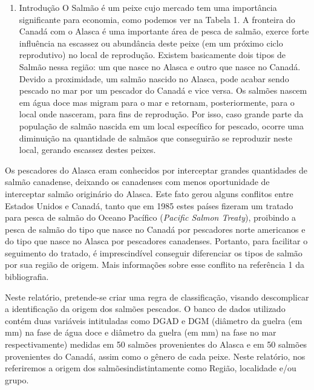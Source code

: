\documentclass[10pt,portuguese,]{article}
\providecommand{\tightlist}{%
  \setlength{\itemsep}{0pt}\setlength{\parskip}{0pt}}
\begin{document}
\setlength{\parindent}{3em} \doublespacing

\begin{enumerate}
\def\labelenumi{\arabic{enumi}.}
\tightlist
\item
  Introdução \vspace{0.5cm} \doublespacing
  O Salmão é um peixe cujo mercado tem uma importância significante para
  economia, como podemos ver na Tabela 1. A fronteira do Canadá com o
  Alasca é uma importante área de pesca de salmão, exerce forte
  influência na escassez ou abundância deste peixe (em um próximo ciclo
  reprodutivo) no local de reprodução. Existem basicamente dois tipos de
  Salmão nessa região: um que nasce no Alasca e outro que nasce no
  Canadá. Devido a proximidade, um salmão nascido no Alasca, pode acabar
  sendo pescado no mar por um pescador do Canadá e vice versa. Os
  salmões nascem em água doce mas migram para o mar e retornam,
  posteriormente, para o local onde nasceram, para fins de reprodução.
  Por isso, caso grande parte da população de salmão nascida em um local
  específico for pescado, ocorre uma diminuição na quantidade de salmãos
  que conseguirão se reproduzir neste local, gerando escassez destes
  peixes.
\end{enumerate}

Os pescadores do Alasca eram conhecidos por interceptar grandes
quantidades de salmão canadense, deixando os canadenses com menos
oportunidade de interceptar salmão originário do Alasca. Este fato gerou
alguns conflitos entre Estados Unidos e Canadá, tanto que em 1985 estes
países fizeram um tratado para pesca de salmão do Oceano Pacífico
(\emph{Pacific Salmon Treaty}), proibindo a pesca de salmão do tipo que
nasce no Canadá por pescadores norte americanos e do tipo que nasce no
Alasca por pescadores canadenses. Portanto, para facilitar o seguimento
do tratado, é imprescindível conseguir diferenciar os tipos de salmão
por sua região de origem. Mais informações sobre esse conflito na
referência 1 da bibliografia.

Neste relatório, pretende-se criar uma regra de classificação, visando
descomplicar a identificação da origem dos salmões pescados. O banco de
dados utilizado contém duas variáveis intituladas como DGAD e DGM
(diâmetro da guelra (em mm) na fase de água doce e diâmetro da guelra
(em mm) na fase no mar respectivamente) medidas em 50 salmões
provenientes do Alasca e em 50 salmões provenientes do Canadá, assim
como o gênero de cada peixe. Neste relatório, nos referiremos a origem
dos salmõesindistintamente como Região, localidade e/ou grupo.
\end{document}
